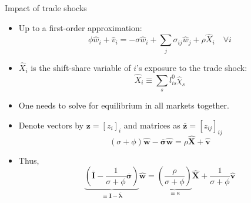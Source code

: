 \documentclass[11pt,notes=hide,aspectratio=169]{beamer}
\begin{document}
\begin{frame}{Impact of trade shocks}
\begin{itemize}
    \item Up to a first-order approximation:
    $$ \phi\hat{w}_{i}+\hat{v}_{i}=-\sigma\hat{w}_{i}+\sum_{j}\sigma_{ij}\hat{w}_{j}+\rho\hat{X}_{i} \quad \forall i $$
    \item \vspace{-2mm}
	$\hat{X}_{i}$ is the shift-share variable of $i$'s exposure to the trade shock:
    $$ \hat{X}_{i}\equiv\sum_{s}l_{is}^{0}\hat{\chi}_{s} $$
    \item One needs to solve for equilibrium in all markets together.
	\item Denote vectors by $\mathbf{z}=[z_{i}]_{i}$ and matrices as $\mathbf{\overline{z}}=[z_{ij}]_{ij}$
    $$(\sigma+\phi)\mathbf{\hat{w}}-\mathbf{\overline{\sigma}}\mathbf{\hat{w}}=\rho\mathbf{\hat{X}}+\mathbf{\hat{v}}$$
    \item Thus, \vspace{-2mm}
    $$ \underbrace{\left(\mathbf{\overline{I}}-\frac{1}{\sigma+\phi}\mathbf{\overline{\sigma}}\right)}_{\equiv \mathbf{I} - \mathbf{\overline{\lambda}}}\mathbf{\hat{w}}
	=
	\underbrace{\left(\frac{\rho}{\sigma+\phi}\right)}_{\equiv \kappa}\mathbf{\hat{X}}+\frac{1}{\sigma+\phi}\mathbf{\hat{v}} $$
\end{itemize}
\end{frame}
\end{document}
